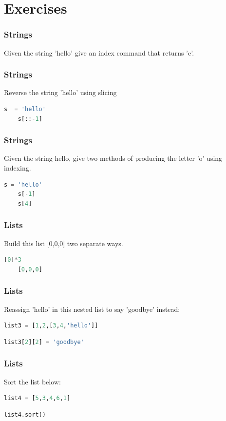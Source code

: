 \section{Exercises}

\begin{frame}
\frametitle{Strings}
Given the string 'hello' give an index command that returns 'e'.
\end{frame}

\begin{frame}[fragile]
\frametitle{Strings}
Reverse the string 'hello' using slicing
\pause
 \begin{lstlisting}[language=Python]
    s  = 'hello'
    s[::-1]
\end{lstlisting}
\end{frame}

\begin{frame}[fragile]
\frametitle{Strings}
Given the string hello, give two methods of producing the letter 'o' using indexing.
\pause
 \begin{lstlisting}[language=Python]
    s = 'hello'
    s[-1]
    s[4]
\end{lstlisting}
\end{frame}

\begin{frame}[fragile]
\frametitle{Lists}
Build this list [0,0,0] two separate ways.
\pause
 \begin{lstlisting}[language=Python]
    [0]*3
    [0,0,0]
\end{lstlisting}
\end{frame}

\begin{frame}[fragile]
\frametitle{Lists}
Reassign 'hello' in this nested list to say 'goodbye' instead: 
 \begin{lstlisting}[language=Python]
    list3 = [1,2,[3,4,'hello']]
\end{lstlisting}
\pause
 \begin{lstlisting}[language=Python]
    list3[2][2] = 'goodbye'
\end{lstlisting}
\end{frame}

\begin{frame}[fragile]
\frametitle{Lists}
Sort the list below: 
 \begin{lstlisting}[language=Python]
    list4 = [5,3,4,6,1]
\end{lstlisting}
\pause
 \begin{lstlisting}[language=Python]
    list4.sort()
\end{lstlisting}
\end{frame}

